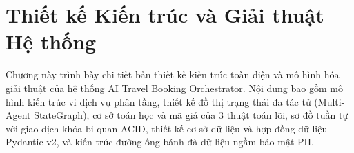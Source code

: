\chapter{Thiết kế Kiến trúc và Giải thuật Hệ thống}
\label{chap:thiet_ke_kien_truc}

Chương này trình bày chi tiết bản thiết kế kiến trúc toàn diện và mô hình hóa giải thuật của hệ thống AI Travel Booking Orchestrator. Nội dung bao gồm mô hình kiến trúc vi dịch vụ phân tầng, thiết kế đồ thị trạng thái đa tác tử (Multi-Agent StateGraph), cơ sở toán học và mã giả của 3 thuật toán lõi, sơ đồ tuần tự với giao dịch khóa bi quan ACID, thiết kế cơ sở dữ liệu và hợp đồng dữ liệu Pydantic v2, và kiến trúc đường ống bánh đà dữ liệu ngầm bảo mật PII.







